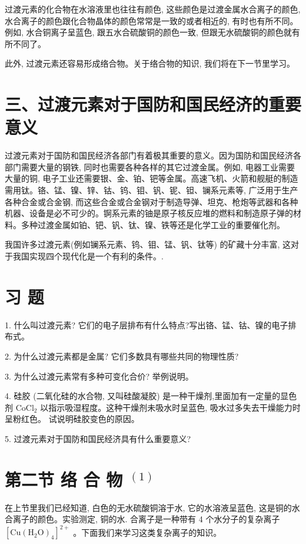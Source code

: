 \documentclass[10pt]{article}
\begin{document}
过渡元素的化合物在水溶液里也往往有颜色, 这些颜色是过渡金属水合离子的颜色, 水合离子的颜色跟化合物晶体的颜色常常是一致的或者相近的, 有时也有所不同。例如, 水合铜离子呈蓝色, 跟五水合硫酸铜的颜色一致, 但跟无水硫酸铜的颜色就有所不同了。

此外, 过渡元素还容易形成络合物。关于络合物的知识, 我们将在下一节里学习。

\section*{三、过渡元素对于国防和国民经济的重要意义}

过渡元素对于国防和国民经济各部门有着极其重要的意义。因为国防和国民经济各部门需要大量的钢铁, 同时也需要各种各样的其它过渡金属。例如, 电器工业需要大量的铜, 电子工业还需要银、金、铂、钯等金属。高速飞机、火箭和舰艇的制造需用钛。铬、锰、镍、锌、钴、钨、钼、钒、铌、钽、镧系元素等, 广泛用于生产各种合金或合金钢, 而这些合金或合金钢对于制造导弹、坦克、枪炮等武器和各种机器、设备是必不可少的。锕系元素的铀是原子核反应堆的燃料和制造原子弹的材料。多种过渡金属如铂、钯、钒、钛、镍、铁等还是化学工业的重要催化剂。

我国许多过渡元素(例如镧系元素、钨、钼、锰、钒、钛等) 的矿藏十分丰富, 这对于我国实现四个现代化是一个有利的条件。.

\section*{习 题}

1. 什么叫过渡元素? 它们的电子层排布有什么特点?写出铬、锰、钴、镍的电子排布式。

2. 为什么过渡元素都是金属? 它们多数具有哪些共同的物理性质?

3. 为什么过渡元素常有多种可变化合价? 举例说明。

4. 硅胶 (二氧化硅的水合物, 又叫硅酸凝胶) 是一种干燥剂,里面加有一定量的显色剂 \({\mathrm{{CoCl}}}_{2}\) 以指示吸湿程度。这种干燥剂未吸水时呈蓝色, 吸水过多失去干燥能力时呈粉红色。 试说明硅胶变色的原因。

5. 过渡元素对于国防和国民经济具有什么重要意义?

\section*{第二节 络 合 物 \({}^{\left( 1\right) }\)}

在上节里我们已经知道, 白色的无水硫酸铜溶于水, 它的水溶液呈蓝色, 这是铜的水合离子的颜色。实验测定, 铜的水. 合离子是一种带有 4 个水分子的复杂离子 \({\left\lbrack \mathrm{{Cu}}{\left( {\mathrm{H}}_{2}\mathrm{O}\right) }_{4}\right\rbrack }^{2 + }\) 。下面我们来学习这类复杂离子的知识。
\end{document}
